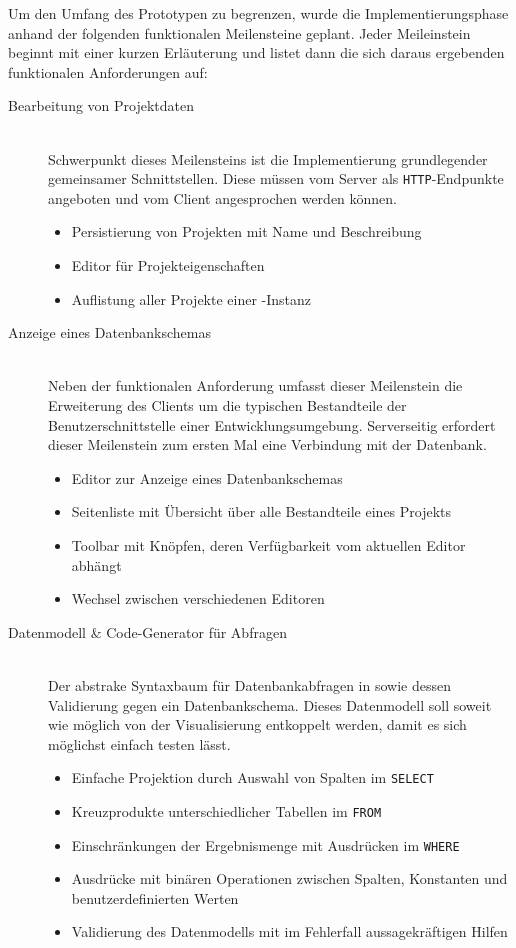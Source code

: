 Um den Umfang des Prototypen zu begrenzen, wurde die Implementierungsphase anhand der folgenden funktionalen Meilensteine geplant. Jeder Meileinstein beginnt mit einer kurzen Erläuterung und listet dann die sich daraus ergebenden funktionalen Anforderungen auf:

\begin{description}
\item[Bearbeitung von Projektdaten] \hfill \\
  Schwerpunkt dieses Meilensteins ist die Implementierung grundlegender gemeinsamer Schnittstellen. Diese müssen vom Server als \texttt{HTTP}-Endpunkte angeboten und vom Client angesprochen werden können.
  \begin{itemize}[noitemsep]
  \item Persistierung von Projekten mit Name und Beschreibung
  \item Editor für Projekteigenschaften
  \item Auflistung aller Projekte einer \idename{}-Instanz
  \end{itemize}
  
\item [Anzeige eines Datenbankschemas] \hfill \\
  Neben der funktionalen Anforderung umfasst dieser Meilenstein die Erweiterung des Clients um die typischen Bestandteile der Benutzerschnittstelle einer Entwicklungsumgebung. Serverseitig erfordert dieser Meilenstein zum ersten Mal eine Verbindung mit der Datenbank.
  \begin{itemize}[noitemsep]
  \item Editor zur Anzeige eines Datenbankschemas
  \item Seitenliste mit Übersicht über alle Bestandteile eines Projekts
  \item Toolbar mit Knöpfen, deren Verfügbarkeit vom aktuellen Editor abhängt
  \item Wechsel zwischen verschiedenen Editoren
  \end{itemize}
  
\item [Datenmodell \& Code-Generator für Abfragen] \hfill \\
  Der abstrake Syntaxbaum für Datenbankabfragen in \idename{} sowie dessen Validierung gegen ein Datenbankschema. Dieses Datenmodell soll soweit wie möglich von der Visualisierung entkoppelt werden, damit es sich möglichst einfach testen lässt.
  \begin{itemize}[noitemsep]
  \item Einfache Projektion durch Auswahl von Spalten im \texttt{SELECT}
  \item Kreuzprodukte unterschiedlicher Tabellen im \texttt{FROM}
  \item Einschränkungen der Ergebnismenge mit Ausdrücken im \texttt{WHERE}
  \item Ausdrücke mit binären Operationen zwischen Spalten, Konstanten und benutzerdefinierten Werten
  \item Validierung des Datenmodells mit im Fehlerfall aussagekräftigen Hilfen
  \end{itemize}
  

\end{description}
